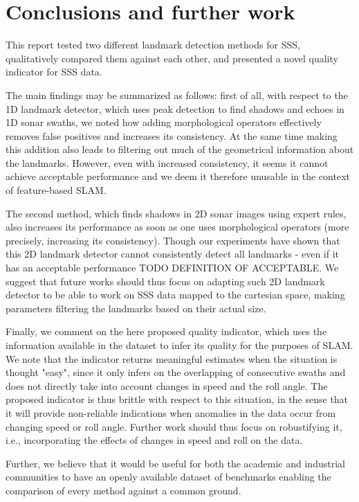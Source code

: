 \chapter{Conclusions and further work}

This report tested two different landmark detection methods for SSS, qualitatively compared them against each other, and presented a novel quality indicator for SSS data. 

The main findings may be summarized as follows: first of all, with respect to the 1D landmark detector, which uses peak detection to find shadows and echoes in 1D sonar swaths, we noted how adding morphological operators effectively removes false positives and increases its consistency. At the same time making this addition also leads to filtering out much of the geometrical information about the landmarks. However, even with increased consistency, it seems it cannot achieve acceptable performance and we deem it therefore unusable in the context of feature-based SLAM.

The second method, which finds shadows in 2D sonar images using expert rules, also increases its performance as soon as one uses morphological operators (more precisely, increasing its consistency). Though our experiments have shown that this 2D landmark detector cannot consistently detect all landmarks - even if it has an acceptable performance TODO DEFINITION OF ACCEPTABLE. We suggest that future works should thus focus on adapting such 2D landmark detector to be able to work on SSS data mapped to the cartesian space, making parameters filtering the landmarks based on their actual size. 

Finally, we comment on the here proposed quality indicator, which uses the information available in the dataset to infer its quality for the purposes of SLAM. We note that the indicator returns meaningful estimates when the situation is thought "easy", since it only infers on the overlapping of consecutive swaths and does not directly take into account changes in speed and the roll angle. The proposed indicator is thus brittle with respect to this situation, in the sense that it will provide non-reliable indications when anomalies in the data occur from changing speed or roll angle. Further work should thus focus on robustifying it, i.e., incorporating the effects of changes in speed and roll on the data. 

Further, we believe that it would be useful for both the academic and industrial communities to have an openly available dataset of benchmarks enabling the comparison of every method against a common ground.







